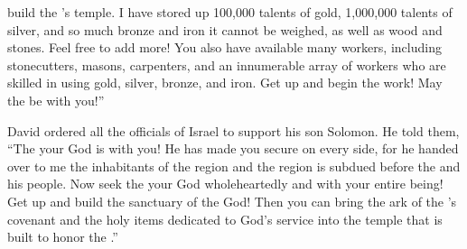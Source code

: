 {build the
{}’s
temple.
I have stored up 100,000
talents
of gold,
1,000,000
talents
of silver,
and so much
bronze
and iron
it cannot
be
weighed,
as well as wood
and stones.
Feel
free to add more!
You also have available
many
workers,
including stonecutters,
masons, carpenters,
and an innumerable array
of workers
who are skilled
in using gold,
silver,
bronze,
and iron.
Get up
and begin
the work! May
the {}
be with you!”
\par }{\PP {}David
ordered
all
the officials
of Israel
to support
his son
Solomon.
He told them, “The
{}
your God
is with
you! He has made you secure
on every side,
for
he handed
over to me the
inhabitants
of the region
and the region
is subdued
before
the {}
and his people.
Now
seek
the {}
your God
wholeheartedly
and with your entire being! Get
up and build
the
sanctuary
of the {}
God! Then you can bring
the
ark
of the
{}’s
covenant
and the holy
items
dedicated to God’s
service into the temple
that is built
to honor
the {}.”

}
